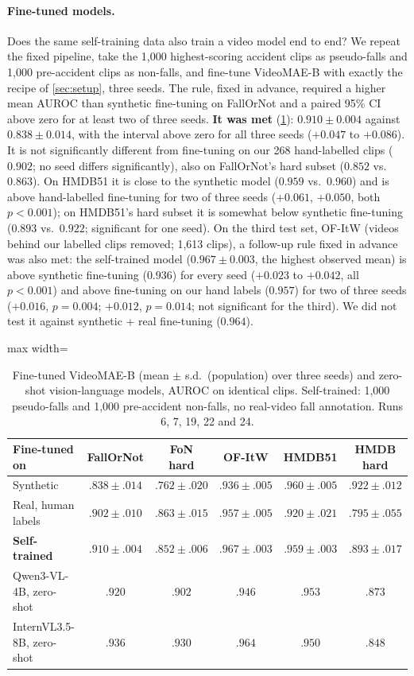 \documentclass[10pt,twocolumn,letterpaper]{article}
\begin{document}
\paragraph{Fine-tuned models.} Does the same self-training data also train a video model end to end? We repeat the fixed pipeline, take the 1,000 highest-scoring accident clips as pseudo-falls and 1,000 pre-accident clips as non-falls, and fine-tune VideoMAE-B with exactly the recipe of \cref{sec:setup}, three seeds. The rule, fixed in advance, required a higher mean AUROC than synthetic fine-tuning on FallOrNot and a paired 95\% CI above zero for at least two of three seeds. \textbf{It was met} (\cref{tab:nolabelft}): $0.910\pm0.004$ against $0.838\pm0.014$, with the interval above zero for all three seeds ($+0.047$ to $+0.086$). It is not significantly different from fine-tuning on our 268 hand-labelled clips ($0.902$; no seed differs significantly), also on FallOrNot's hard subset ($0.852$ vs.\ $0.863$). On HMDB51 it is close to the synthetic model ($0.959$ vs.\ $0.960$) and is above hand-labelled fine-tuning for two of three seeds ($+0.061$, $+0.050$, both $p<0.001$); on HMDB51's hard subset it is somewhat below synthetic fine-tuning ($0.893$ vs.\ $0.922$; significant for one seed). On the third test set, OF-ItW (videos behind our labelled clips removed; 1,613 clips), a follow-up rule fixed in advance was also met: the self-trained model ($0.967\pm0.003$, the highest observed mean) is above synthetic fine-tuning ($0.936$) for every seed ($+0.023$ to $+0.042$, all $p<0.001$) and above fine-tuning on our hand labels ($0.957$) for two of three seeds ($+0.016$, $p=0.004$; $+0.012$, $p=0.014$; not significant for the third). We did not test it against synthetic + real fine-tuning ($0.964$).

\begin{table}[t]\centering\small
\caption{Fine-tuned VideoMAE-B (mean $\pm$ s.d.\ (population) over three seeds) and zero-shot vision-language models, AUROC on identical clips. Self-trained: 1,000 pseudo-falls and 1,000 pre-accident non-falls, no real-video fall annotation. Runs 6, 7, 19, 22 and 24.}
\label{tab:nolabelft}
\begin{adjustbox}{max width=\linewidth}
\begin{tabular}{lccccc}\toprule
Fine-tuned on & FallOrNot & FoN hard & OF-ItW & HMDB51 & HMDB hard\\\midrule
Synthetic & $.838\pm.014$ & $.762\pm.020$ & $.936\pm.005$ & $\mathbf{.960}\pm.005$ & $\mathbf{.922}\pm.012$\\
Real, human labels & $.902\pm.010$ & $.863\pm.015$ & $.957\pm.005$ & $.920\pm.021$ & $.795\pm.055$\\
\textbf{Self-trained} & $.910\pm.004$ & $.852\pm.006$ & $\mathbf{.967}\pm.003$ & $.959\pm.003$ & $.893\pm.017$\\\midrule
Qwen3-VL-4B, zero-shot & $.920$ & $.902$ & $.946$ & $.953$ & $.873$\\
InternVL3.5-8B, zero-shot & $\mathbf{.936}$ & $\mathbf{.930}$ & $.964$ & $.950$ & $.848$\\\bottomrule
\end{tabular}
\end{adjustbox}
\end{table}
\end{document}
